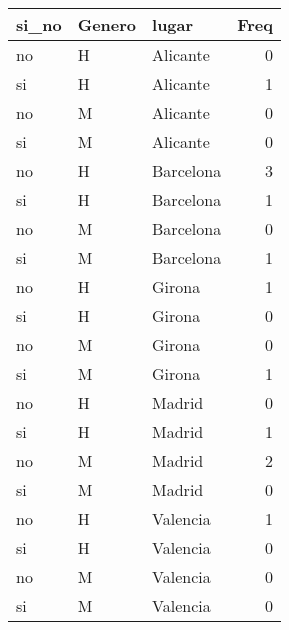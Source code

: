 \documentclass[]{article}
\begin{document}
\begin{tabular}{l|l|l|r}
\hline
si\_no & Genero & lugar & Freq\\
\hline
no & H & Alicante & 0\\
\hline
si & H & Alicante & 1\\
\hline
no & M & Alicante & 0\\
\hline
si & M & Alicante & 0\\
\hline
no & H & Barcelona & 3\\
\hline
si & H & Barcelona & 1\\
\hline
no & M & Barcelona & 0\\
\hline
si & M & Barcelona & 1\\
\hline
no & H & Girona & 1\\
\hline
si & H & Girona & 0\\
\hline
no & M & Girona & 0\\
\hline
si & M & Girona & 1\\
\hline
no & H & Madrid & 0\\
\hline
si & H & Madrid & 1\\
\hline
no & M & Madrid & 2\\
\hline
si & M & Madrid & 0\\
\hline
no & H & Valencia & 1\\
\hline
si & H & Valencia & 0\\
\hline
no & M & Valencia & 0\\
\hline
si & M & Valencia & 0\\
\hline
\end{tabular}
\end{document}
